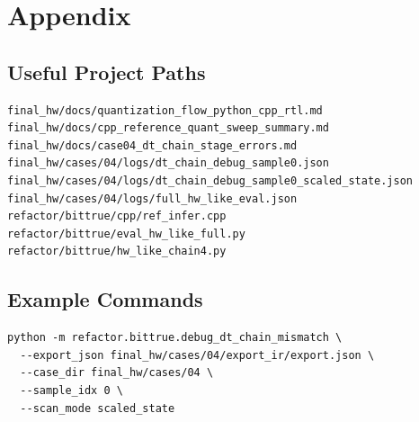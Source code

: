 \chapter{Appendix}

\section{Useful Project Paths}

\begin{lstlisting}
final_hw/docs/quantization_flow_python_cpp_rtl.md
final_hw/docs/cpp_reference_quant_sweep_summary.md
final_hw/docs/case04_dt_chain_stage_errors.md
final_hw/cases/04/logs/dt_chain_debug_sample0.json
final_hw/cases/04/logs/dt_chain_debug_sample0_scaled_state.json
final_hw/cases/04/logs/full_hw_like_eval.json
refactor/bittrue/cpp/ref_infer.cpp
refactor/bittrue/eval_hw_like_full.py
refactor/bittrue/hw_like_chain4.py
\end{lstlisting}

\section{Example Commands}

\begin{lstlisting}
python -m refactor.bittrue.debug_dt_chain_mismatch \
  --export_json final_hw/cases/04/export_ir/export.json \
  --case_dir final_hw/cases/04 \
  --sample_idx 0 \
  --scan_mode scaled_state
\end{lstlisting}

